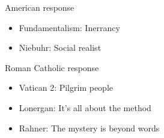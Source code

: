 \begin{frame}[label=sec-1-5]{American response}
\begin{itemize}
\item Fundamentalism: Inerrancy
\item Niebuhr: Social realist
\end{itemize}
\end{frame}

\begin{frame}[label=sec-1-6]{Roman Catholic response}
\begin{itemize}
\item Vatican 2: Pilgrim people
\item Lonergan: It's all about the method
\item Rahner: The mystery is beyond words
\end{itemize}
\end{frame}

